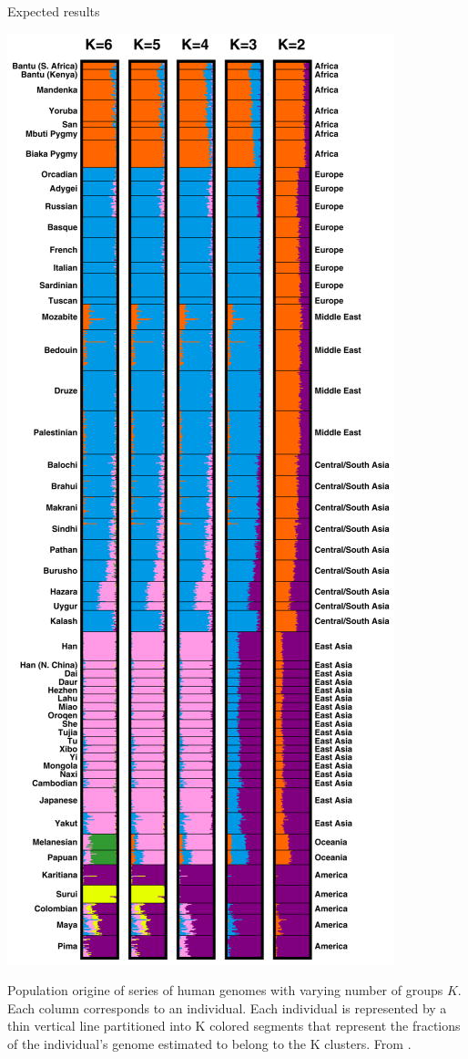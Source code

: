 \documentclass[compress,10pt]{beamer}
\begin{document}
\begin{frame}{Expected results}

\begin{center}
\includegraphics[angle=90, scale = 0.6]{nihms426502f6}   
\end{center}

Population origine of series of human genomes with varying number of groups $K$. Each column corresponds to an individual. 
Each individual is represented by a thin vertical line partitioned into K colored segments that represent the fractions of the individual’s genome estimated to belong to the K clusters.
From \cite{Rosenberg11}. 


\end{frame}
\end{document}
